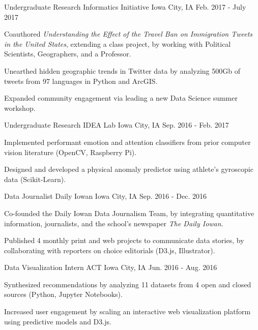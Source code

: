\begin{cventries}
\cventry
  {Undergraduate Research}
  {Informatics Initiative}
  {Iowa City, IA}
  {Feb. 2017 - July 2017}
  {
    \begin{cvitems}
      \item {Coauthored \textit{Understanding the Effect of the Travel Ban on Immigration Tweets in the United States}, extending a class project, by working with Political Scientists, Geographers, and a Professor.}
      \item {Unearthed hidden geographic trends in Twitter data by analyzing 500Gb of tweets from 97 languages in Python and ArcGIS.}
      \item {Expanded community engagement via leading a new Data Science summer workshop.}
    \end{cvitems}
  }
  \cventry
    {Undergraduate Research}
    {IDEA Lab}
    {Iowa City, IA}
    {Sep. 2016 - Feb. 2017}
    {
      \begin{cvitems}
        \item{Implemented performant emotion and attention classifiers from prior computer vision literature (OpenCV, Raspberry Pi).}
        \item {Designed and developed a physical anomaly predictor using athlete's gyroscopic data (Scikit-Learn). }
      \end{cvitems}
    }
  \cventry
    {Data Journalist}
    {Daily Iowan}
    {Iowa City, IA}
    {Sep. 2016 - Dec. 2016}
    {
      \begin{cvitems}
        \item {Co-founded the Daily Iowan Data Journalism Team, by integrating quantitative information, journalists, and the school's newspaper \textit{The Daily Iowan}.}
        \item {Published 4 monthly print and web projects to communicate data stories, by collaborating with reporters on choice editorials (D3.js, Illustrator).}
      \end{cvitems}
    }
  \cventry
    {Data Visualization Intern}
    {ACT}
    {Iowa City, IA}
    {Jun. 2016 - Aug. 2016}
    {
      \begin{cvitems}
        \item {Synthesized recommendations by analyzing 11 datasets from 4 open and closed sources (Python, Jupyter Notebooks). }
        \item {Increased user engagement by scaling an interactive web visualization platform using predictive models and D3.js.}

\end{cvitems}}
\end{cventries}
